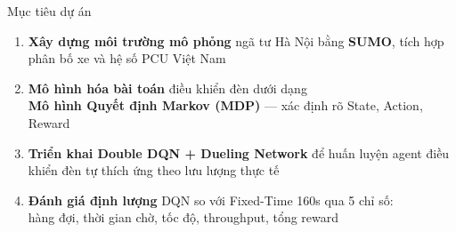 \begin{frame}{Mục tiêu dự án}
  \begin{enumerate}
    \setlength{\itemsep}{8pt}
    \item \textbf{Xây dựng môi trường mô phỏng} ngã tư Hà Nội bằng \textbf{SUMO}, tích hợp phân bố xe và hệ số PCU Việt Nam

    \item \textbf{Mô hình hóa bài toán} điều khiển đèn dưới dạng\\
          \textbf{Mô hình Quyết định Markov (MDP)} --- xác định rõ State, Action, Reward

    \item \textbf{Triển khai Double DQN + Dueling Network} để huấn luyện agent điều khiển đèn tự thích ứng theo lưu lượng thực tế

    \item \textbf{Đánh giá định lượng} DQN so với Fixed-Time 160s qua 5 chỉ số:\\
          hàng đợi, thời gian chờ, tốc độ, throughput, tổng reward
  \end{enumerate}
\end{frame}

